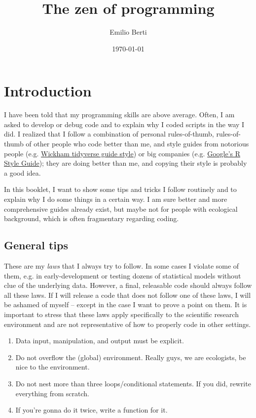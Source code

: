 \documentclass{book}
\title{The zen of programming}
\author{Emilio Berti}
\date{\today}
\begin{document}
\maketitle

\tableofcontents

\chapter{Introduction}

I have been told that my programming skills are above average. Often, I am asked to develop or debug code and to explain why I coded scripts in the way I did. I realized that I follow a combination of personal rules-of-thumb, rules-of-thumb of other people who code better than me, and style guides from notorious people (e.g. \href{https://style.tidyverse.org/}{Wickham tidyverse guide style}) or big companies (e.g. \href{https://google.github.io/styleguide/Rguide.html}{Google’s R Style Guide}); they are doing better than me, and copying their style is probably a good idea. 

In this booklet, I want to show some tips and tricks I follow routinely and to explain why I do some things in a certain way. I am sure better and more comprehensive guides already exist, but maybe not for people with ecological background, which is often fragmentary regarding coding.

\section{General tips}

These are my \textit{laws} that I always try to follow. In some cases I violate some of them, e.g. in early-development or testing dozens of statistical models without clue of the underlying data. However, a final, releasable code should always follow all these laws. If I will release a code that does not follow one of these laws, I will be ashamed of myself -- except in the case I want to prove a point on them. It is important to stress that these laws apply specifically to the scientific research environment and are not representative of how to properly code in other settings.

\begin{enumerate}
    \item Data input, manipulation, and output must be explicit.
    \item Do not overflow the (global) environment. Really guys, we are ecologists, be nice to the environment.
    \item Do not nest more than three loops/conditional statements. If you did, rewrite everything from scratch.
    \item If you're gonna do it twice, write a function for it.
\end{enumerate}
\end{document}
